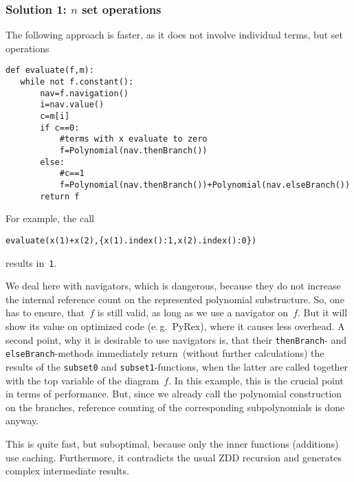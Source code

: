 \documentclass[]{article}
\begin{document}
\subsubsection{Solution 1: $n$ set operations}
The following approach is faster, as it does not involve individual terms, but set operations

\begin{verbatim}
def evaluate(f,m):
   while not f.constant():
       nav=f.navigation()
       i=nav.value()
       c=m[i]
       if c==0:
           #terms with x evaluate to zero
           f=Polynomial(nav.thenBranch())
       else:
           #c==1
           f=Polynomial(nav.thenBranch())+Polynomial(nav.elseBranch())
       return f   
\end{verbatim}
For example, the call
\begin{verbatim}
evaluate(x(1)+x(2),{x(1).index():1,x(2).index():0})  
\end{verbatim}
results in~\verb|1|.



We deal here with navigators, which is dangerous, because
they do not increase the internal reference count on the represented polynomial
substructure. So, one has
to ensure, that~$f$ is still valid, as long as we use a navigator on~$f$.
But it will show its value on optimized code (e.\,g.\ PyRex), where it causes
less overhead. 
A second point, why it is desirable to use navigators is, that their
\verb|thenBranch|- and \verb|elseBranch|-methods immediately return~(without
further calculations) the
results of the \verb|subset0| and \verb|subset1|-functions, when the latter are
called together  with the top variable of the diagram~$f$.
%
In this example, this is the crucial point in terms of performance.
But, since we already call the polynomial construction on the branches,
reference counting of the corresponding subpolynomials is done anyway.

This is quite fast, but suboptimal, because only the inner functions (additions) use caching.
%
Furthermore, it contradicts the usual ZDD recursion and generates complex intermediate results.
\end{document}
